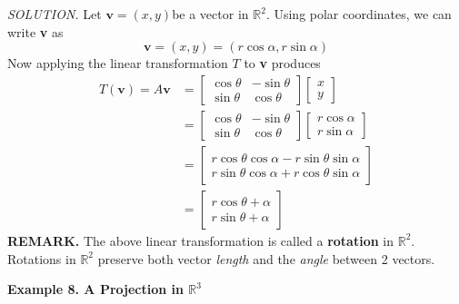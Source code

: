 \documentclass{article}
\newcommand\B{\textbf}
\newcommand\R{\mathbb{R}}
\begin{document}
    \textit{ \textcolor{blue5}{SOLUTION.} } Let $\B{v} = (x,y)$be a vector in $\R^2$. Using polar coordinates, we can write \textbf{v} as
    \[\B{v} = (x,y) = (r \cos{\alpha}, r \sin{\alpha})\]
    Now applying the linear transformation $T$ to \textbf{v} produces
    \begin{equation*}
        \begin{split}
            T(\B{v}) = A\B{v} &= \begin{bmatrix}
        \cos{\theta} & -\sin{\theta} \\
        \sin{\theta} & \cos{\theta}
    \end{bmatrix} \begin{bmatrix}
        x \\ y
    \end{bmatrix} \\
                              &= \begin{bmatrix}
        \cos{\theta} & -\sin{\theta} \\
        \sin{\theta} & \cos{\theta}
    \end{bmatrix} \begin{bmatrix}
        r \cos{\alpha}  \\ r \sin{\alpha} \end{bmatrix}  \\
                     &= \begin{bmatrix}
                         r \cos{\theta} \cos{\alpha} - r \sin{\theta} \sin{\alpha} \\
                         r \sin{\theta} \cos{\alpha} + r \cos{\theta} \sin{\alpha}
                     \end{bmatrix} \\
                     &= \begin{bmatrix}
                         r \cos{\theta + \alpha} \\
                         r \sin{\theta + \alpha}
                     \end{bmatrix}
        \end{split}
    \end{equation*}
    \textbf{REMARK.} The above linear transformation is called a \textbf{rotation} in $\R^2$. Rotations in $\R^2$ preserve both vector \textit{length}
    and the \textit{angle} between 2 vectors.

    \textbf{Example 8. \textcolor{blue5}{A Projection in $\R^3$}}
\end{document}
